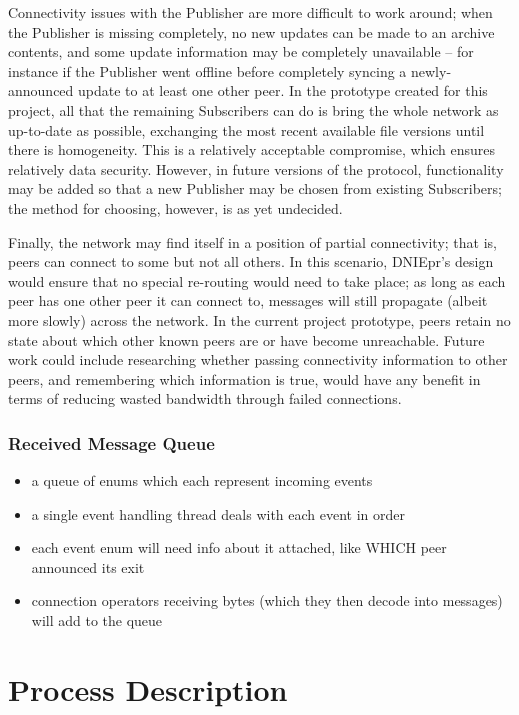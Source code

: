 \documentclass[12pt,a4paper,]{adreport}
\begin{document}
Connectivity issues with the Publisher are more difficult to work
around; when the Publisher is missing completely, no new updates can be
made to an archive contents, and some update information may be
completely unavailable -- for instance if the Publisher went offline
before completely syncing a newly-announced update to at least one other
peer. In the prototype created for this project, all that the remaining
Subscribers can do is bring the whole network as up-to-date as possible,
exchanging the most recent available file versions until there is
homogeneity. This is a relatively acceptable compromise, which ensures
relatively data security. However, in future versions of the protocol,
functionality may be added so that a new Publisher may be chosen from
existing Subscribers; the method for choosing, however, is as yet
undecided.

Finally, the network may find itself in a position of partial
connectivity; that is, peers can connect to some but not all others. In
this scenario, DNIEpr's design would ensure that no special re-routing
would need to take place; as long as each peer has one other peer it can
connect to, messages will still propagate (albeit more slowly) across
the network. In the current project prototype, peers retain no state
about which other known peers are or have become unreachable. Future
work could include researching whether passing connectivity information
to other peers, and remembering which information is true, would have
any benefit in terms of reducing wasted bandwidth through failed
connections.

\subsection{Received Message Queue}\label{received-message-queue}

\begin{itemize}
\itemsep1pt\parskip0pt
\item
  a queue of enums which each represent incoming events
\item
  a single event handling thread deals with each event in order
\item
  each event enum will need info about it attached, like WHICH peer
  announced its exit
\item
  connection operators receiving bytes (which they then decode into
  messages) will add to the queue
\end{itemize}

\chapter{Process Description}\label{process-description}
\end{document}
